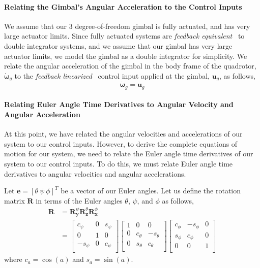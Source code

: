 \paragraph{Relating the Gimbal's Angular Acceleration to the Control Inputs}
We assume that our 3 degree-of-freedom gimbal is fully actuated, and has very large actuator limits. Since fully actuated systems are \emph{feedback equivalent}~\cite{tedrake:2014} to double integrator systems, and we assume that our gimbal has very large actuator limits, we model the gimbal as a double integrator for simplicity. We relate the angular acceleration of the gimbal in the body frame of the quadrotor, $\dot{\mathbf{\omega}}_g$ to the \emph{feedback linearized}~\cite{tedrake:2014} control input applied at the gimbal, $\mathbf{u}_g$, as follows,
%
\begin{equation}
\dot{\mathbf{\omega}}_g = \mathbf{u}_g
\end{equation}
%

\paragraph{Relating Euler Angle Time Derivatives to Angular Velocity and Angular Acceleration}

At this point, we have related the angular velocities and accelerations of our system to our control inputs.
However, to derive the complete equations of motion for our system, we need to relate the Euler angle time derivatives of our system to our control inputs.
To do this, we must relate Euler angle time derivatives to angular velocities and angular accelerations.

Let $\mathbf{e} = [ \theta ~ \psi ~ \phi ]^T$ be a vector of our Euler angles.
Let us define the rotation matrix $\mathbf{R}$ in terms of the Euler angles $\theta$, $\psi$, and $\phi$ as follows,
%
\footnotesize
\begin{equation}
\begin{aligned}
%
\mathbf{R} & = \mathbf{R}_{\mathbf{y}}^{\psi} \mathbf{R}_{\mathbf{z}}^{\theta} \mathbf{R}_{\mathbf{x}}^{\phi} \\
& = 
\begin{bmatrix}
c_\psi  & 0 & s_\psi \\
0       & 1 & 0 \\
-s_\psi & 0 & c_\psi \\
\end{bmatrix}
\begin{bmatrix}
1 & 0        & 0 \\
0 & c_\theta & -s_\theta \\
0 & s_\theta & c_\theta \\
\end{bmatrix}
%
\begin{bmatrix}
c_\phi & -s_\phi & 0 \\
s_\phi & c_\phi  & 0 \\
0      & 0       & 1 \\
\end{bmatrix}
%
%
\end{aligned}
\end{equation}
\normalsize
%
where $c_a=\cos(a)$ and $s_a=\sin(a)$.

